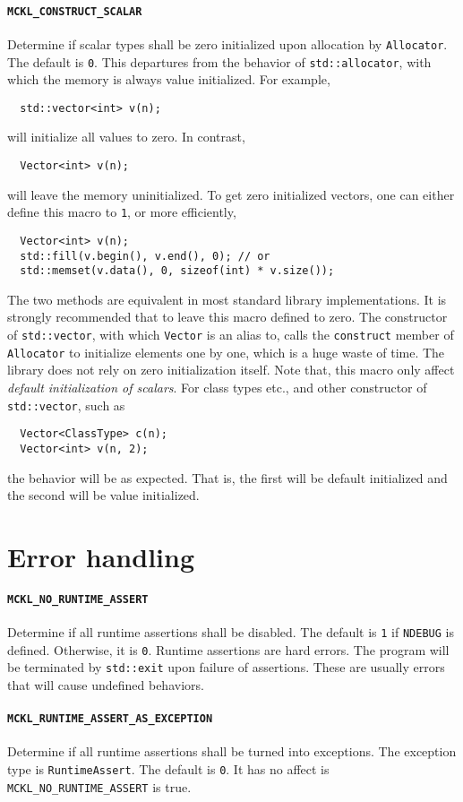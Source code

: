 \paragraph{\texttt{MCKL\_CONSTRUCT\_SCALAR}} Determine if scalar types shall be
zero initialized upon allocation by \verb|Allocator|. The default is \verb|0|.
This departures from the behavior of \verb|std::allocator|, with which the
memory is always value initialized. For example,
\begin{Verbatim}
  std::vector<int> v(n);
\end{Verbatim}
will initialize all values to zero. In contrast,
\begin{Verbatim}
  Vector<int> v(n);
\end{Verbatim}
will leave the memory uninitialized. To get zero initialized vectors, one can
either define this macro to \verb|1|, or more efficiently,
\begin{Verbatim}
  Vector<int> v(n);
  std::fill(v.begin(), v.end(), 0); // or
  std::memset(v.data(), 0, sizeof(int) * v.size());
\end{Verbatim}
The two methods are equivalent in most standard library implementations. It is
strongly recommended that to leave this macro defined to zero. The constructor
of \verb|std::vector|, with which \verb|Vector| is an alias to, calls the
\verb|construct| member of \verb|Allocator| to initialize elements one by one,
which is a huge waste of time. The library does not rely on zero initialization
itself. Note that, this macro only affect \emph{default initialization of
  scalars}. For class types etc., and other constructor of \verb|std::vector|,
such as
\begin{Verbatim}
  Vector<ClassType> c(n);
  Vector<int> v(n, 2);
\end{Verbatim}
the behavior will be as expected. That is, the first will be default
initialized and the second will be value initialized.

\section{Error handling}
\label{sec:Error handling}

\paragraph{\texttt{MCKL\_NO\_RUNTIME\_ASSERT}} Determine if all runtime
assertions shall be disabled. The default is \verb|1| if \verb|NDEBUG| is
defined. Otherwise, it is \verb|0|. Runtime assertions are hard errors. The
program will be terminated by \verb|std::exit| upon failure of assertions.
These are usually errors that will cause undefined behaviors.

\paragraph{\texttt{MCKL\_RUNTIME\_ASSERT\_AS\_EXCEPTION}} Determine if all
runtime assertions shall be turned into exceptions. The exception type is
\verb|RuntimeAssert|. The default is \verb|0|. It has no affect is
\verb|MCKL_NO_RUNTIME_ASSERT| is true.
